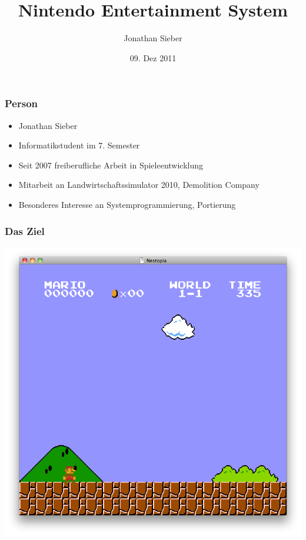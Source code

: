 \documentclass{beamer}
\title{Nintendo Entertainment System}
\author{Jonathan Sieber}
\date[09.12.11]{09. Dez 2011}
\institute{Betreuer: Dipl.-Ing. Benjamin Thielmann}
\begin{document}
    \begin{frame}
        \maketitle
        \begin{center}
        \end{center}
    \end{frame}
    
    \begin{frame}
    \frametitle{Person}
    \begin{itemize}
        \item{Jonathan Sieber}
        \item{Informatikstudent im 7. Semester}
        \item{Seit 2007 freiberufliche Arbeit in Spieleentwicklung}
        \item{Mitarbeit an Landwirtschaftssimulator 2010, Demolition Company}
        \item{Besonderes Interesse an Systemprogrammierung, Portierung}
    \end{itemize}
    \end{frame}
    
    
    \begin{frame}
        \frametitle{Das Ziel}
        \includegraphics[width=0.8\linewidth]{img/smb.png}
    \end{frame}
    
    
        
\end{document}
